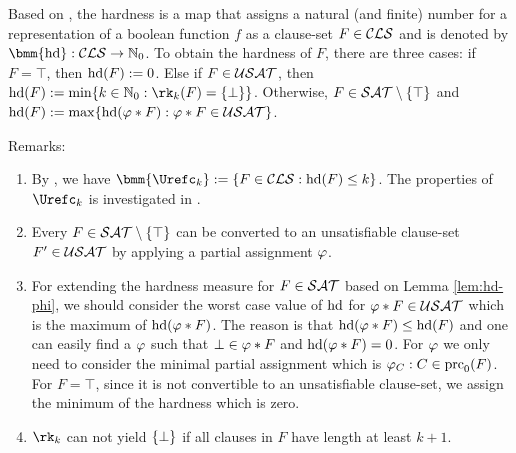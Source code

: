 \documentclass{report}
\begin{document}
\begin{defi}\label{def:hd-extended}
Based on \cite{BeyersdorffGwynneKullmann2013PHPER}, the hardness is a map that assigns a natural (and finite) number for a representation of a boolean function $f$ as a clause-set $F \in \mathcal{CLS}$ and is denoted by $\bmm{\hardness} : \Cls \rightarrow \NNZ$. To obtain the hardness of  $F$, there are three cases: if $F = \top$, then $\operatorname{hd}(F) := 0$. Else if $F \in \mathcal{USAT}$, then $\hardness(F) := \min \set{k \in \NNZ : \rk_k(F)=\set{\bot}}$. Otherwise, $F \in \mathcal{SAT} \setminus \{ \top \}$ and $\operatorname{hd}(F) := \max \{  \operatorname{hd}(\varphi * F) : \varphi * F \in \mathcal{USAT}  \}$.
\end{defi}

Remarks:
  \begin{enumerate}
  \item By \cite{BeyersdorffGwynneKullmann2013PHPER}, we have $\bmm{\Urefc_k} := \set{F \in \Cls : \hardness(F) \le k}$. The properties of $\Urefc_k$ is investigated in \cite{GwynneKullmann2012Slur}.
  \item Every $F \in \mathcal{SAT} \setminus \{ \top \}$ can be converted to an unsatisfiable clause-set $F' \in \mathcal{USAT}$ by applying a partial assignment $\varphi$. 
  \item For extending the hardness measure for $F \in \mathcal{SAT}$ based on Lemma \ref{lem:hd-phi}, we should consider the worst case value of $\operatorname{hd}$ for $\varphi * F \in \mathcal{USAT}$ which is the maximum of $\operatorname{hd}(\varphi * F)$. The reason is that $\operatorname{hd}(\varphi * F) \leq \operatorname{hd}(F)$ and one can easily find a $\varphi$ such that $\bot \in \varphi * F$ and $\operatorname{hd}(\varphi * F)=0$. For $\varphi$ we only need to consider the minimal partial assignment which is $\varphi_C : C \in \operatorname{prc}_0(F)$. For $F = \top$, since it is not convertible to an unsatisfiable clause-set, we assign the minimum of the hardness which is zero.  
  \item $\rk_k$ can not yield $\{ \bot \}$ if all clauses in $F$ have length at least $k+1$.
\end{enumerate}
\end{document}

